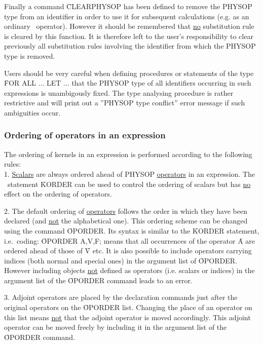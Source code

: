 Finally a command \f{CLEARPHYSOP} 
has been defined to remove
the PHYSOP type from an identifier in order to use it for subsequent
calculations (e.g. as an ordinary \REDUCE\ operator). However it should be
remembered that \underline{no}
substitution rule is cleared by this function. It
is therefore left to the user's responsibility to clear previously all
substitution rules involving the identifier from which the PHYSOP type
is removed.

Users should be very careful when defining procedures or statements of
the type \f{FOR ALL ... LET ...} that the PHYSOP type of all identifiers
occurring in such expressions is unambigously fixed. The type analysing
procedure is rather restrictive and will print out a ''PHYSOP type
conflict'' error message if such ambiguities occur.

\subsubsection{Ordering of operators in an expression}

The ordering of kernels in an expression is performed according to
the following rules: \\
1. \underline{Scalars} are always ordered ahead of
PHYSOP \underline{operators} in an expression.
The \REDUCE\ statement \f{KORDER}  can be used to control the
ordering of scalars but has \underline{no}
effect on the ordering of operators.

2. The default ordering of \underline{operators} follows the
order in which they have been declared (and \underline{not}
the alphabetical one).
This ordering scheme can be changed using the command \f{OPORDER}.
Its syntax is similar to the \f{KORDER} statement, i.e.\ coding:
\f{OPORDER A,V,F;}
means that all occurrences of the operator \f{A} are ordered ahead of
those of \f{V} etc. It is also possible to include operators
carrying
indices (both normal and special ones) in the argument list of
\f{OPORDER}. However including objects  \underline{not}
defined as operators (i.e. scalars or indices) in the argument list
of the \f{OPORDER} command leads to an error.

3. Adjoint operators are placed by the declaration commands just
after the original operators on the \f{OPORDER} list. Changing the
place of an operator on this list means \underline{not} that the
adjoint operator is moved accordingly. This adjoint operator can
be moved freely  by including it in the argument list of the
\f{OPORDER} command.

